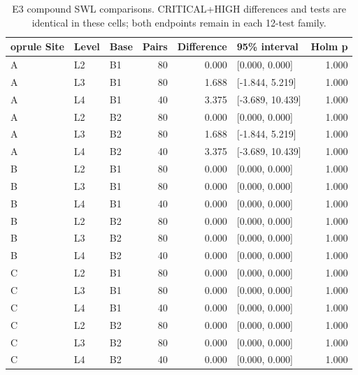 \begin{table}[H]\centering\footnotesize
\caption{E3 compound SWL comparisons. CRITICAL+HIGH differences and tests are identical in these cells; both endpoints remain in each 12-test family.}\label{tab:e3_tests}
\begin{tabularx}{\textwidth}{@{}lllrrYr@{}}	oprule
Site & Level & Base & Pairs & Difference & 95\% interval & Holm p \\\midrule
A & L2 & B1 & 80 & 0.000 & [0.000, 0.000] & 1.000 \\
A & L3 & B1 & 80 & 1.688 & [-1.844, 5.219] & 1.000 \\
A & L4 & B1 & 40 & 3.375 & [-3.689, 10.439] & 1.000 \\
A & L2 & B2 & 80 & 0.000 & [0.000, 0.000] & 1.000 \\
A & L3 & B2 & 80 & 1.688 & [-1.844, 5.219] & 1.000 \\
A & L4 & B2 & 40 & 3.375 & [-3.689, 10.439] & 1.000 \\
B & L2 & B1 & 80 & 0.000 & [0.000, 0.000] & 1.000 \\
B & L3 & B1 & 80 & 0.000 & [0.000, 0.000] & 1.000 \\
B & L4 & B1 & 40 & 0.000 & [0.000, 0.000] & 1.000 \\
B & L2 & B2 & 80 & 0.000 & [0.000, 0.000] & 1.000 \\
B & L3 & B2 & 80 & 0.000 & [0.000, 0.000] & 1.000 \\
B & L4 & B2 & 40 & 0.000 & [0.000, 0.000] & 1.000 \\
C & L2 & B1 & 80 & 0.000 & [0.000, 0.000] & 1.000 \\
C & L3 & B1 & 80 & 0.000 & [0.000, 0.000] & 1.000 \\
C & L4 & B1 & 40 & 0.000 & [0.000, 0.000] & 1.000 \\
C & L2 & B2 & 80 & 0.000 & [0.000, 0.000] & 1.000 \\
C & L3 & B2 & 80 & 0.000 & [0.000, 0.000] & 1.000 \\
C & L4 & B2 & 40 & 0.000 & [0.000, 0.000] & 1.000 \\
\bottomrule\end{tabularx}\end{table}